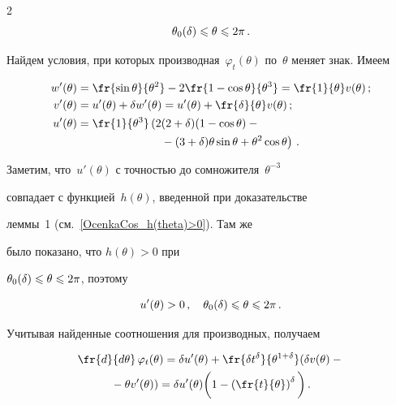 \begin{multicols}{2}
\begin{equation*}
\theta_0(\d)\le\theta\le2\pi\,.

\end{equation*}

Найдем условия, при которых производная~$\varphi_{t}(\theta)$ по~$\theta$ меняет знак. Имеем

\begin{align*}

w^\prime(\theta)&=

\fr{\sin\theta}{\theta^2}-2\fr{1-\cos\theta}{\theta^3}=

\fr{1}{\theta}v(\theta)\,;\\

v^\prime(\theta)&= u^\prime(\theta)+\d w^\prime(\theta)=u^\prime(\theta)+\fr{\d}{\theta}v(\theta)\,;\\

u^\prime(\theta)&= \fr{1}{\theta^3}\left(2(2+\d)(1-\cos\theta)-{}\right.\\

&\hspace*{25mm}\left.{}-

(3+\d)\theta\sin\theta+\theta^2\cos\theta\right)\,.

\end{align*}

Заметим, что~$u'(\theta)$ с точностью до сомножителя~$\theta^{-3}$

совпадает с функцией~$h(\theta)$, введенной при доказательстве

леммы~1 (см.~\eqref{OcenkaCos_h(theta)>0}). Там же

было показано, что ${h(\theta)>0}$ при

${\theta_0(\delta)\leqslant\theta\leqslant2\pi}$, поэтому

$$

u^\prime(\theta)>0\,,\quad\theta_0(\d)\le\theta\le2\pi\,.

$$

Учитывая найденные соотношения для производных, получаем

\begin{multline*}

\fr{d}{d\theta}\,\varphi_{t}(\theta)= \d u^\prime(\theta)+\fr{\d

t^{\d}}{\theta^{1+\d}}(\d v(\theta)-{}\\

{}-

\theta v'(\theta))= \d

u^\prime(\theta)\bigg(1-\left(\fr{t}{\theta}\right)^{\d}\bigg)\,.

\end{multline*}


\end{multicols}
